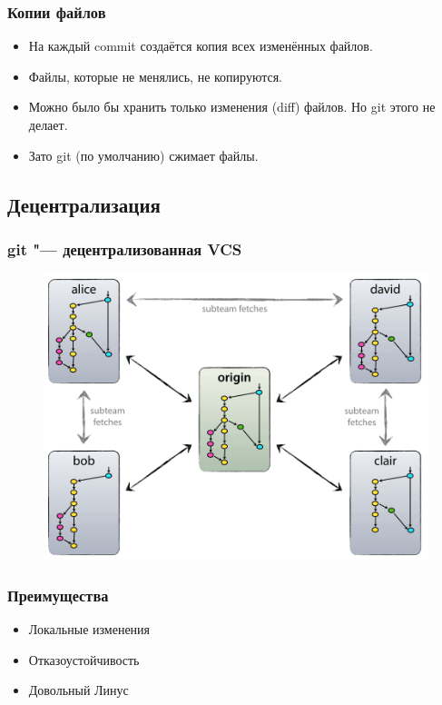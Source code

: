 \documentclass[pdf,russian,aspectratio=169]{beamer}
\begin{document}
\begin{frame}
    \frametitle{Копии файлов}
    \begin{itemize}
        \pause
        \item На каждый commit создаётся копия всех изменённых файлов.
        \pause
        \item Файлы, которые не менялись, не копируются.
        \pause
        \item Можно было бы хранить только изменения (diff) файлов.
            \pause Но git этого не делает.
        \pause
        \item Зато git (по умолчанию) сжимает файлы.
    \end{itemize}
\end{frame}

\subsection{Децентрализация}

\begin{frame}
    \frametitle{git "--- децентрализованная VCS}
    \begin{figure}
        \includegraphics[height=0.8\textheight]{decentr}
    \end{figure}
\end{frame}

\begin{frame}
    \frametitle{Преимущества}
    \begin{itemize}
        \pause
        \item Локальные изменения
        \pause
        \item Отказоустойчивость
        \pause
        \item Довольный Линус
    \end{itemize}
\end{frame}
\end{document}
